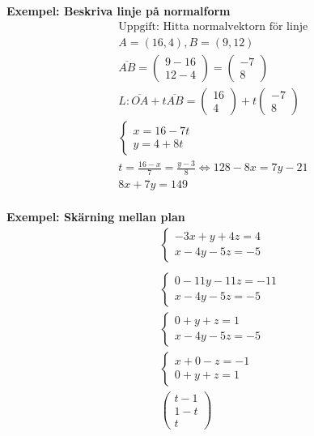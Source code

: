 \begin{multicols}{2}
\textbf{Exempel: Beskriva linje på normalform} 
\begin{align*} %
  &\text{Uppgift: Hitta normalvektorn för linje } \\
  &A=(16,4), B=(9,12) \\
  &\overline{AB} = 
  \begin{pmatrix} 9-16 \\ 12-4 \end{pmatrix} = \begin{pmatrix} -7 \\ 8 \end{pmatrix} \\
  &L: \overline{OA}+t\overline{AB}=
  \begin{pmatrix} 16 \\ 4 \end{pmatrix} + t\begin{pmatrix} -7 \\ 8 \end{pmatrix} \\
  &\left\{\begin{array}{r}
  x=16-7t \\
  y=4+8t  
  \end{array}\right. \\
  &t=\frac{16-x}{7}=\frac{y-3}{8} \Leftrightarrow{} 128 -8x=7y-21 \\
  &8x+7y=149 \\
\end{align*}

\textbf{Exempel: Skärning mellan plan} %
\begin{align*} %
  &\quad  \left\{\begin{array}{r}
  -3x+y+4z=4 \\
  x-4y-5z=-5 
  \end{array}\right. \\
  &\quad  \\
  &\quad  \left\{\begin{array}{r}
  0-11y-11z=-11 \\
  x-4y-5z=-5 
  \end{array}\right. \\
  &\quad  \left\{\begin{array}{r}
  0+y+z=1 \\
  x-4y-5z=-5 
  \end{array}\right. \\
  &\quad  \left\{\begin{array}{r}
  x+0-z=-1 \\
  0+y+z=1 
  \end{array}\right. \\
  &\quad  \begin{pmatrix} t-1 \\ 1-t \\ t \end{pmatrix} \\
\end{align*}



\end{multicols}
